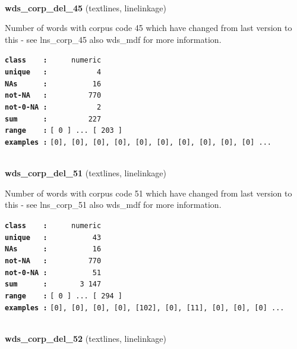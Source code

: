 \documentclass[]{article}
\begin{document}
~

\textbf{wds\_corp\_del\_45} (textlines, linelinkage)

Number of words with corpus code 45 which have changed from last version
to this - see lns\_corp\_45 also wds\_mdf for more information.

\textbf{\texttt{class\ \ \ \ :}} \texttt{~~~~~numeric}\\
\textbf{\texttt{unique\ \ \ :}} \texttt{~~~~~~~~~~~4}\\
\textbf{\texttt{NAs\ \ \ \ \ \ :}} \texttt{~~~~~~~~~~16}\\
\textbf{\texttt{not-NA\ \ \ :}} \texttt{~~~~~~~~~770}\\
\textbf{\texttt{not-0-NA\ :}} \texttt{~~~~~~~~~~~2}\\
\textbf{\texttt{sum\ \ \ \ \ \ :}} \texttt{~~~~~~~~~227}\\
\textbf{\texttt{range\ \ \ \ :}}
\texttt{{[}\ 0\ {]}\ ...\ {[}\ 203\ {]}}\\
\textbf{\texttt{examples\ :}}
\texttt{{[}0{]},\ {[}0{]},\ {[}0{]},\ {[}0{]},\ {[}0{]},\ {[}0{]},\ {[}0{]},\ {[}0{]},\ {[}0{]},\ {[}0{]}\ ...}\\

~

\textbf{wds\_corp\_del\_51} (textlines, linelinkage)

Number of words with corpus code 51 which have changed from last version
to this - see lns\_corp\_51 also wds\_mdf for more information.

\textbf{\texttt{class\ \ \ \ :}} \texttt{~~~~~numeric}\\
\textbf{\texttt{unique\ \ \ :}} \texttt{~~~~~~~~~~43}\\
\textbf{\texttt{NAs\ \ \ \ \ \ :}} \texttt{~~~~~~~~~~16}\\
\textbf{\texttt{not-NA\ \ \ :}} \texttt{~~~~~~~~~770}\\
\textbf{\texttt{not-0-NA\ :}} \texttt{~~~~~~~~~~51}\\
\textbf{\texttt{sum\ \ \ \ \ \ :}} \texttt{~~~~~~~3~147}\\
\textbf{\texttt{range\ \ \ \ :}}
\texttt{{[}\ 0\ {]}\ ...\ {[}\ 294\ {]}}\\
\textbf{\texttt{examples\ :}}
\texttt{{[}0{]},\ {[}0{]},\ {[}0{]},\ {[}0{]},\ {[}102{]},\ {[}0{]},\ {[}11{]},\ {[}0{]},\ {[}0{]},\ {[}0{]}\ ...}\\

~

\textbf{wds\_corp\_del\_52} (textlines, linelinkage)
\end{document}
